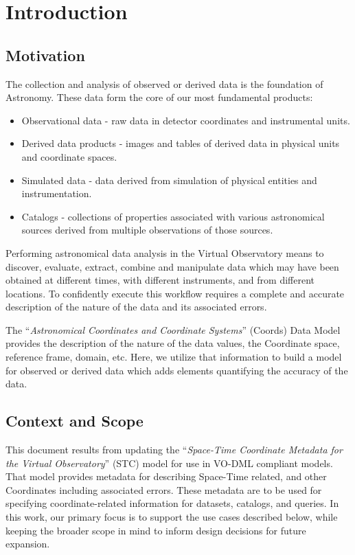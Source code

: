 \documentclass[11pt,a4paper]{ivoa}
\begin{document}
\section{Introduction}

\subsection{Motivation}
The collection and analysis of observed or derived data is the foundation of Astronomy.  
These data form the core of our most fundamental products:
\begin{itemize}
  \item Observational data - raw data in detector coordinates and instrumental units.
  \item Derived data products - images and tables of derived data in physical units and coordinate spaces.
  \item Simulated data - data derived from simulation of physical entities and instrumentation.
  \item Catalogs - collections of properties associated with various astronomical sources derived from multiple observations of those sources.
\end{itemize}

Performing astronomical data analysis in the Virtual Observatory means to discover, evaluate, 
extract, combine and manipulate data which may have been obtained at different times, 
with different instruments, and from different locations.  To confidently execute this workflow 
requires a complete and accurate description of the nature of the data and its associated errors.  

The ``\emph{Astronomical Coordinates and Coordinate Systems}'' (Coords) \citep{std:Coords} Data Model provides the description of the nature of the data values, the Coordinate space, reference frame, domain, etc.  Here, we utilize that information to build a model for observed or derived data which adds elements quantifying the accuracy of the data.

\subsection{Context and Scope}

This document results from updating the ``\emph{Space-Time Coordinate Metadata for the Virtual Observatory}'' (STC) \citep{2007ivoa.spec.1030R} model for use in VO-DML compliant models.  That model provides metadata for describing Space-Time related, and other Coordinates including associated errors.  These metadata are to be used for specifying coordinate-related information for datasets, catalogs, and queries.  In this work, our primary focus is to support the use cases described below, while keeping the broader scope in mind to inform design decisions for future expansion.
\end{document}
